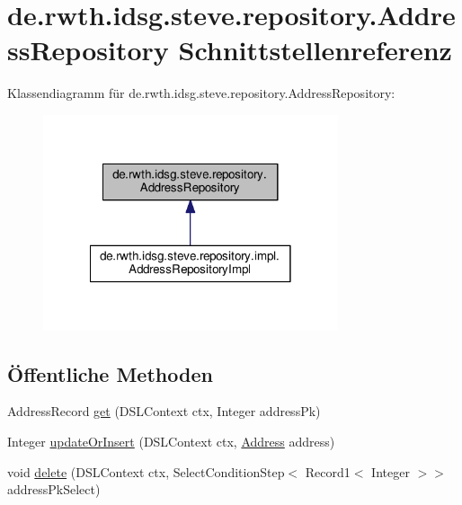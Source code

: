 \hypertarget{interfacede_1_1rwth_1_1idsg_1_1steve_1_1repository_1_1_address_repository}{\section{de.\-rwth.\-idsg.\-steve.\-repository.\-Address\-Repository Schnittstellenreferenz}
\label{interfacede_1_1rwth_1_1idsg_1_1steve_1_1repository_1_1_address_repository}
}


Klassendiagramm für de.\-rwth.\-idsg.\-steve.\-repository.\-Address\-Repository\-:\nopagebreak
\begin{figure}[H]
\begin{center}
\leavevmode
\includegraphics[width=246pt]{interfacede_1_1rwth_1_1idsg_1_1steve_1_1repository_1_1_address_repository__inherit__graph}
\end{center}
\end{figure}
\subsection*{Öffentliche Methoden}
\begin{DoxyCompactItemize}
\item 
Address\-Record \hyperlink{interfacede_1_1rwth_1_1idsg_1_1steve_1_1repository_1_1_address_repository_acc5c330b5125ff03b0a235d5a11c7df1}{get} (D\-S\-L\-Context ctx, Integer address\-Pk)
\item 
Integer \hyperlink{interfacede_1_1rwth_1_1idsg_1_1steve_1_1repository_1_1_address_repository_a35873a3790f0f03326015bb90a64a5f8}{update\-Or\-Insert} (D\-S\-L\-Context ctx, \hyperlink{classde_1_1rwth_1_1idsg_1_1steve_1_1web_1_1dto_1_1_address}{Address} address)
\item 
void \hyperlink{interfacede_1_1rwth_1_1idsg_1_1steve_1_1repository_1_1_address_repository_ac5969057336e8053dc8cdf378e804981}{delete} (D\-S\-L\-Context ctx, Select\-Condition\-Step$<$ Record1$<$ Integer $>$$>$ address\-Pk\-Select)
\end{DoxyCompactItemize}


